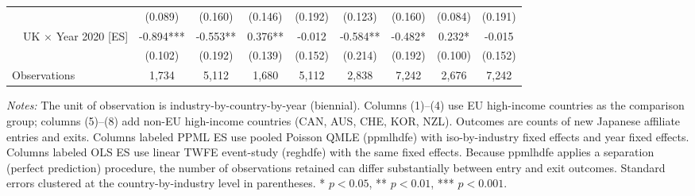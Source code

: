 \begin{table}[!ht]
\begin{threeparttable}
\begin{tabular}{l*{8}{c}}
                    &     (0.089)   &     (0.160)   &     (0.146)   &     (0.192)   &     (0.123)   &     (0.160)   &     (0.084)   &     (0.191)   \\
~~UK $\times$ Year 2020 [ES]&      -0.894***&      -0.553** &       0.376** &      -0.012   &      -0.584** &      -0.482*  &       0.232*  &      -0.015   \\
                    &     (0.102)   &     (0.192)   &     (0.139)   &     (0.152)   &     (0.214)   &     (0.192)   &     (0.100)   &     (0.152)   \\
\midrule
Observations        &       1,734   &       5,112   &       1,680   &       5,112   &       2,838   &       7,242   &       2,676   &       7,242   \\
\bottomrule\end{tabular}\end{threeparttable}\par\medskip\parbox{\linewidth}{\footnotesize \textit{Notes:}  The unit of observation is industry-by-country-by-year (biennial). Columns (1)--(4) use EU high-income countries as the comparison group; columns (5)--(8) add non-EU high-income countries (CAN, AUS, CHE, KOR, NZL). Outcomes are counts of new Japanese affiliate entries and exits. Columns labeled PPML ES use pooled Poisson QMLE (ppmlhdfe) with iso-by-industry fixed effects and year fixed effects. Columns labeled OLS ES use linear TWFE event-study (reghdfe) with the same fixed effects. Because ppmlhdfe applies a separation (perfect prediction) procedure, the number of observations retained can differ substantially between entry and exit outcomes. Standard errors clustered at the country-by-industry level in parentheses. * $p<0.05$, ** $p<0.01$, *** $p<0.001$. }\end{table}
